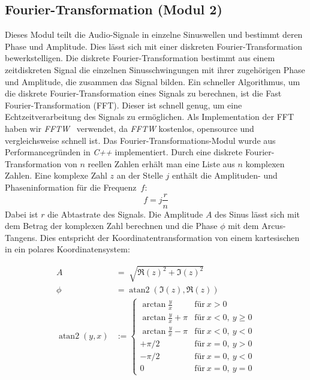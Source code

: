 \subsection{Fourier-Transformation (Modul 2)}
Dieses Modul teilt die Audio-Signale in einzelne Sinuswellen und bestimmt deren Phase und Amplitude. Dies lässt sich mit einer diskreten Fourier-Transformation bewerkstelligen. Die diskrete Fourier-Transformation bestimmt aus einem zeitdiskreten Signal die einzelnen Sinusschwingungen mit ihrer zugehörigen Phase und Amplitude, die zusammen das Signal bilden. Ein schneller Algorithmus, um die diskrete Fourier-Transformation eines Signals zu berechnen, ist die Fast Fourier-Transformation (FFT). Dieser ist schnell genug, um eine Echtzeitverarbeitung des Signals zu ermöglichen. Als Implementation der FFT haben wir \textit{FFTW}~\cite{FFTW} verwendet, da \textit{FFTW} kostenlos, opensource und vergleichsweise schnell ist.
Das Fourier-Transformations-Modul wurde aus Performancegründen in \textit{C++} implementiert.
Durch eine diskrete Fourier-Transformation von $n$ reellen Zahlen erhält man eine Liste aus $n$ komplexen Zahlen. Eine komplexe Zahl $z$ an der Stelle $j$ enthält die Amplituden- und Phaseninformation für die Frequenz~$f$:
\begin{equation}
f = j\frac{r}{n}
\end{equation}
Dabei ist $r$ die Abtastrate des Signals. Die Amplitude $A$ des Sinus lässt sich mit dem Betrag der komplexen Zahl berechnen und die Phase $\phi$ mit dem Arcus-Tangens. Dies entspricht der Koordinatentransformation von einem kartesischen in ein polares Koordinatensystem:\\
\begin{minipage}{0.49\textwidth}
   \begin{align}
    A &= \sqrt[]{{\Re(z)}^2 + {\Im(z)}^2}\\
    \phi &= \operatorname{atan2}(\Im(z), \Re(z))\\
    \operatorname{atan2}(y,x) &:= \begin{cases} \arctan\frac{y}{x} & \mathrm{für}\ x > 0\\ \arctan\frac{y}{x} + \pi & \mathrm{für}\ x < 0,\ y \geq 0\\ \arctan\frac{y}{x} - \pi & \mathrm{für}\ x < 0,\ y < 0\\ +\pi/2 & \mathrm{für}\ x = 0,\ y > 0\\ -\pi/2 & \mathrm{für}\ x = 0,\ y < 0\\ 0 & \mathrm{für}\ x = 0,\ y = 0 \end{cases}
    \end{align}
\end{minipage}
